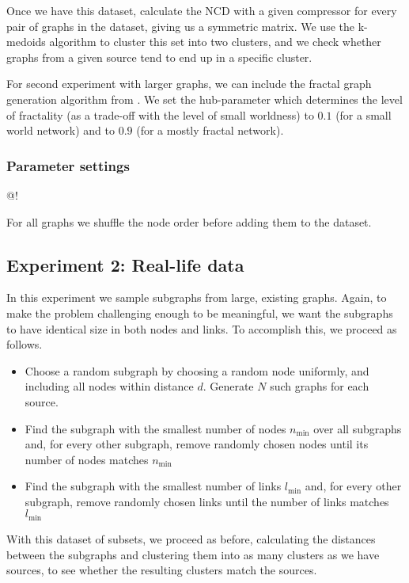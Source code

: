 \documentclass[10pt,a4paper,oneside]{article}
\begin{document}
Once we have this dataset, calculate the NCD with a given compressor for every pair of graphs in the dataset, giving us a symmetric matrix. We use the k-medoids algorithm to cluster this set into two clusters, and we check whether graphs from a given source tend to end up in a specific cluster. 

For second experiment with larger graphs, we can include the fractal graph generation algorithm from \cite{song2006origins}. We set the hub-parameter which determines the level of fractality (as a trade-off with the level of small worldness) to $0.1$ (for a small world network) and to $0.9$ (for a mostly fractal network).

\subsubsection*{Parameter settings}

@!

For all graphs we shuffle the node order before adding them to the dataset.

\subsection*{Experiment 2: Real-life data} 

In this experiment we sample subgraphs from large, existing graphs. Again, to make the problem challenging enough to be meaningful, we want the subgraphs to have identical size in both nodes and links. To accomplish this, we proceed as follows.

\begin{itemize}
  \item Choose a random subgraph by choosing a random node uniformly, and including all nodes within distance $d$. Generate $N$ such graphs for each source.
  \item Find the subgraph with the smallest number of nodes $n_{\mbox{min}}$ over all subgraphs and, for every other subgraph, remove randomly chosen nodes until its number of nodes matches $n_{\mbox{min}}$
  \item Find the subgraph with the smallest number of links $l_{\mbox{min}}$ and, for every other subgraph, remove randomly chosen links until the number of links matches $l_{\mbox{min}}$ 
\end{itemize} 

With this dataset of subsets, we proceed as before, calculating the distances between the subgraphs and clustering them into as many clusters as we have sources, to see whether the resulting clusters match the sources.
\end{document}
